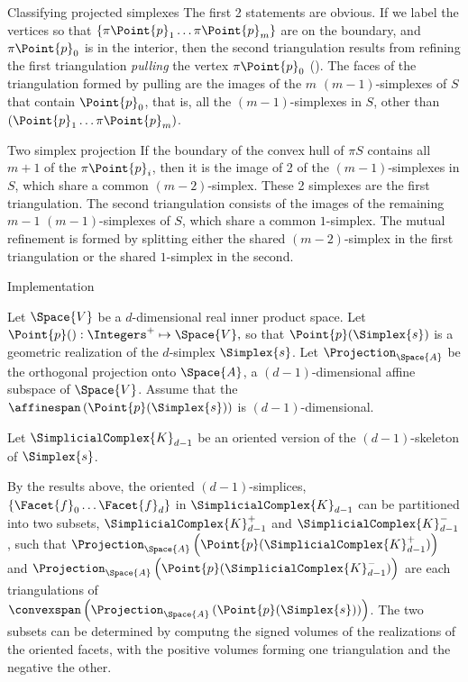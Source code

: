 \begin{plSection}{Classifying projected simplexes}
The first 2 statements are obvious.
If we label the vertices so that $\left\{\pi \Point{p}_1 \ldots  \pi \Point{p}_m\right\}$
are on the boundary, and $\pi \Point{p}_0$ is in the interior,
then the second triangulation results from refining the first
triangulation {\it pulling} the vertex $\pi \Point{p}_0$
().
The faces of the triangulation formed by pulling
are the images of the $m$ $(m-1)$-simplexes
of $S$ that contain $\Point{p}_0$, that is, all the $(m-1)$-simplexes in $S$,
other than $(\Point{p}_1 \ldots  \pi \Point{p}_m)$.

\begin{plTheorem}{Two simplex projection}{}
\label{two-simplex-case}
If the boundary of the convex hull of $\pi S$
contains all $m+1$ of the $\pi \Point{p}_i$,
then it is the image of 2 of the $(m-1)$-simplexes in $S$,
which share a common $(m-2)$-simplex.
These 2 simplexes are the first triangulation.
The second triangulation consists of the images
of the remaining $m-1$ $(m-1)$-simplexes of $S$,
which share a common $1$-simplex.
The mutual refinement is formed by splitting either
the shared $(m-2)$-simplex in the first triangulation
or the shared $1$-simplex in the second.
\end{plTheorem}

\begin{plSection}{Implementation}

Let $\Space{V}$ be a $d$-dimensional real inner product space.
Let $\Point{p}() : \Integers^{+} \mapsto \Space{V},$
so that $\Point{p}(\Simplex{s})$ is a geometric realization 
of the $d$-simplex $\Simplex{s}$.
Let $\Projection_{\Space{A}}$ be the orthogonal projection onto
$\Space{A}$, a $(d-1)$-dimensional affine subspace of $\Space{V}$.
Assume that the $\affinespan \left( \Point{p}(\Simplex{s}) \right)$
is $(d-1)$-dimensional.

Let $\SimplicialComplex{K}_{d-1}$ be an oriented version of the $(d-1)$-skeleton of $\Simplex{s}$.

By the results above, the oriented $(d-1)$-simplices,
$\left\{ \Facet{f}_0 \ldots \Facet{f}_d \right\}$ in $\SimplicialComplex{K}_{d-1}$
can be partitioned into two subsets, $\SimplicialComplex{K}_{d-1}^{+}$
and $\SimplicialComplex{K}_{d-1}^{-}$, such that
$\Projection_{\Space{A}} \left( \Point{p} ( \SimplicialComplex{K}_{d-1}^{+} ) \right)$
and
$\Projection_{\Space{A}} \left( \Point{p} ( \SimplicialComplex{K}_{d-1}^{-} ) \right)$
are each triangulations of
$\convexspan \left( \Projection_{\Space{A}} \left( \Point{p} ( \Simplex{s} ) \right) \right)$.
The two subsets can be determined by computng the signed
volumes of the realizations of the oriented facets,
with the positive volumes forming one triangulation and the negative the other.


\end{plSection}
\end{plSection}
